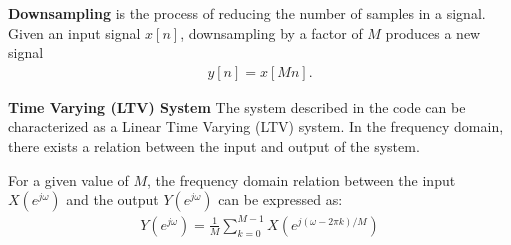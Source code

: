 \documentclass{article}
\begin{document}
\textbf{Downsampling} is the process of reducing the number of samples in a signal. Given an input signal \(x[n]\), downsampling by a factor of \(M\) produces a new signal 
\begin{align}
y[n] = x[Mn].
\end{align}


\textbf{Time Varying (LTV) System}
The system described in the code can be characterized as a Linear Time Varying (LTV) system. In the frequency domain, there exists a relation between the input and output of the system.

For a given value of \(M\), the frequency domain relation between the input \(X(e^{j\omega})\) and the output \(Y(e^{j\omega})\) can be expressed as:
\begin{align}
Y(e^{j\omega}) = \frac{1}{M} \sum_{k=0}^{M-1} X\left(e^{j(\omega-2\pi k)/M}\right)
\end{align}
\end{document}
